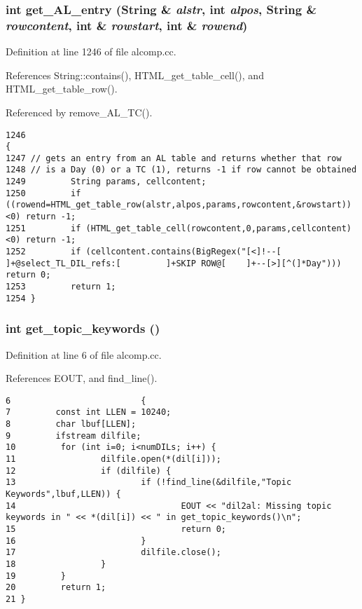 \subsubsection{\setlength{\rightskip}{0pt plus 5cm}int get\_\-AL\_\-entry ({\bf String} \& {\em alstr}, int {\em alpos}, {\bf String} \& {\em rowcontent}, int \& {\em rowstart}, int \& {\em rowend})}\label{alcomp_8cc_a14}




Definition at line 1246 of file alcomp.cc.

References String::contains(), HTML\_\-get\_\-table\_\-cell(), and HTML\_\-get\_\-table\_\-row().

Referenced by remove\_\-AL\_\-TC().



\footnotesize\begin{verbatim}1246                                                                                                {
1247 // gets an entry from an AL table and returns whether that row
1248 // is a Day (0) or a TC (1), returns -1 if row cannot be obtained
1249         String params, cellcontent;
1250         if ((rowend=HTML_get_table_row(alstr,alpos,params,rowcontent,&rowstart))<0) return -1;
1251         if (HTML_get_table_cell(rowcontent,0,params,cellcontent)<0) return -1;
1252         if (cellcontent.contains(BigRegex("[<]!--[      ]+@select_TL_DIL_refs:[         ]+SKIP ROW@[    ]+--[>][^(]*Day"))) return 0;
1253         return 1;
1254 }
\end{verbatim}\normalsize 
{}
\subsubsection{\setlength{\rightskip}{0pt plus 5cm}int get\_\-topic\_\-keywords ()}\label{alcomp_8cc_a3}




Definition at line 6 of file alcomp.cc.

References EOUT, and find\_\-line().



\footnotesize\begin{verbatim}6                          {
7         const int LLEN = 10240;
8         char lbuf[LLEN];
9         ifstream dilfile;
10         for (int i=0; i<numDILs; i++) {
11                 dilfile.open(*(dil[i]));
12                 if (dilfile) {
13                         if (!find_line(&dilfile,"Topic Keywords",lbuf,LLEN)) {
14                                 EOUT << "dil2al: Missing topic keywords in " << *(dil[i]) << " in get_topic_keywords()\n";
15                                 return 0;
16                         }
17                         dilfile.close();
18                 }
19         }
20         return 1;
21 }
\end{verbatim}\normalsize 
{}
